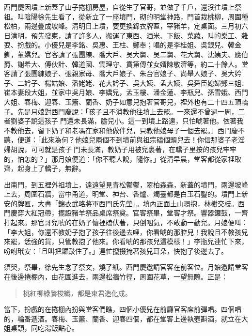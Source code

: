 西門慶因墳上新蓋了山子捲棚房屋，自從生了官哥，並做了千戶，還沒往墳上祭祖。叫陰陽徐先生看了，從新立了一座墳門，砌的明堂神路，門首栽桃柳，周圍種松柏，兩邊疊成坡峰。清明日上墳，要更換錦衣牌匾，宰豬羊，定桌面。三月初六日清明，預先發柬，請了許多人，搬運了東西、酒米、下飯、菜蔬，叫的樂工、雜耍、扮戲的。小優兒是李銘、吳惠、王柱、鄭奉；唱的是李桂姐、吳銀兒、韓金釧，董嬌兒。官客請了張團練、喬大戶、吳大舅、吳二舅、花大舅、沈姨夫、應伯爵、謝希大、傅伙計、韓道國、雲理守、賁第傳並女婿陳敬濟等，約二十餘人。堂客請了張團練娘子、張親家母、喬大戶娘子、朱台官娘子、尚舉人娘子、吳大妗子、二妗子、楊姑娘、潘姥姥、花大妗子、吳大姨、孟大姨、吳舜臣媳婦鄭三姐、崔本妻段大姐，並家中吳月娘、李嬌兒，孟玉樓、潘金蓮、李瓶兒、孫雪娥、西門大姐、春梅、迎春、玉簫、蘭香、奶子如意兒抱著官哥兒，裡外也有二十四五頂轎子。先是月娘對西門慶說：「孩子且不消教他往墳上去罷。一來還不曾過一周，二者劉婆子說這孩子𩕄門還未長滿，膽兒小。這一到墳上路遠，只怕唬著他。依著我不教他去，留下奶子和老馮在家和他做伴兒，只教他娘母子一個去罷。」西門慶不聽，便道：「此來為何？他娘兒兩個不到墳前與祖宗磕個頭兒去！你信那婆子老淫婦胡說，可可就是孩子𩕄門未長滿，教奶子用被兒裹著，在轎子里按的孩兒牢牢的，怕怎的？」那月娘便道：「你不聽人說，隨你。」從清早晨，堂客都從家裡取齊，起身上了轎子，無辭。

出南門，到五裡外祖墳上，遠遠望見青松鬱鬱，翠柏森森，新蓋的墳門，兩邊坡峰上去，周圍石牆，當中甬道，明堂、神台、香爐、燭臺都是白玉石鑿的。墳門上新安的牌匾，大書「錦衣武略將軍西門氏先塋」。墳內正面土山環抱，林樹交枝。西門慶穿大紅冠帶，擺設豬羊祭品桌席祭奠。官客祭畢，堂客才祭。響器鑼鼓，一齊打起來。那官哥兒唬的在奶子懷裡磕伏著，只倒咽氣，不敢動一動兒。月娘便叫：「李大姐，你還不教奶子抱了孩子往後邊去哩，你看唬的那腔兒！我說且不教孩兒來罷，恁強的貨，只管教抱了他來。你看唬的那孩兒這模樣！」李瓶兒連忙下來，吩咐玳安：「且叫把鑼鼓住了。」連忙攛掇掩著孩兒耳朵，快抱了後邊去了。

須臾，祭畢，徐先生念了祭文，燒了紙。西門慶邀請官客在前客位。月娘邀請堂客在後邊捲棚內，由花園進去，兩邊松牆竹徑，周圍花草，一望無際。正是：
\begin{quote}
桃紅柳綠鶯梭織，都是東君造化成。
\end{quote}

當下，扮戲的在捲棚內扮與堂客們瞧，四個小優兒在前廳官客席前彈唱。四個唱的，輪番遞酒。春梅、玉簫、蘭香、迎春四個，都在堂客上邊執壺斟酒，就立在大姐桌頭，同吃湯飯點心。

